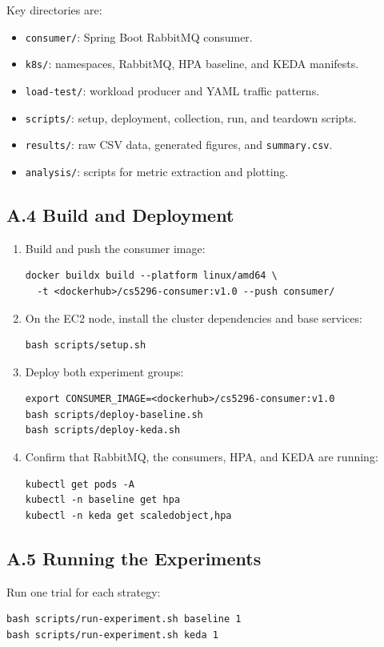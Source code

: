 Key directories are:
\begin{itemize}
  \item \texttt{consumer/}: Spring Boot RabbitMQ consumer.
  \item \texttt{k8s/}: namespaces, RabbitMQ, HPA baseline, and KEDA manifests.
  \item \texttt{load-test/}: workload producer and YAML traffic patterns.
  \item \texttt{scripts/}: setup, deployment, collection, run, and teardown scripts.
  \item \texttt{results/}: raw CSV data, generated figures, and \texttt{summary.csv}.
  \item \texttt{analysis/}: scripts for metric extraction and plotting.
\end{itemize}

\subsection*{A.4 Build and Deployment}
\begin{enumerate}
  \item Build and push the consumer image:
\begin{verbatim}
docker buildx build --platform linux/amd64 \
  -t <dockerhub>/cs5296-consumer:v1.0 --push consumer/
\end{verbatim}
  \item On the EC2 node, install the cluster dependencies and base services:
\begin{verbatim}
bash scripts/setup.sh
\end{verbatim}
  \item Deploy both experiment groups:
\begin{verbatim}
export CONSUMER_IMAGE=<dockerhub>/cs5296-consumer:v1.0
bash scripts/deploy-baseline.sh
bash scripts/deploy-keda.sh
\end{verbatim}
  \item Confirm that RabbitMQ, the consumers, HPA, and KEDA are running:
\begin{verbatim}
kubectl get pods -A
kubectl -n baseline get hpa
kubectl -n keda get scaledobject,hpa
\end{verbatim}
\end{enumerate}

\subsection*{A.5 Running the Experiments}
Run one trial for each strategy:
\begin{verbatim}
bash scripts/run-experiment.sh baseline 1
bash scripts/run-experiment.sh keda 1
\end{verbatim}


